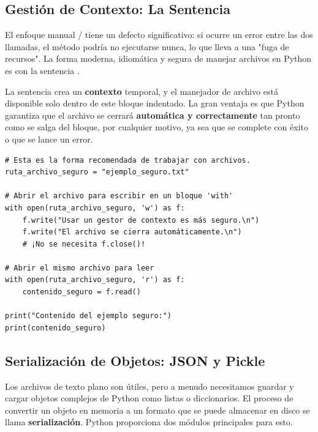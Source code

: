 \subsection{Gestión de Contexto: La Sentencia }
\label{subsec:with_open}
El enfoque manual / tiene un defecto significativo: si ocurre un error entre las dos llamadas, el método  podría no ejecutarse nunca, lo que lleva a una "fuga de recursos". La forma moderna, idiomática y segura de manejar archivos en Python es con la sentencia .

La sentencia  crea un \textbf{contexto} temporal, y el manejador de archivo está disponible solo dentro de este bloque indentado. La gran ventaja es que Python garantiza que el archivo se cerrará \textbf{automática y correctamente} tan pronto como se salga del bloque, por cualquier motivo, ya sea que se complete con éxito o que se lance un error.

\begin{example}
\text{ }\begin{verbatim}
# Esta es la forma recomendada de trabajar con archivos.
ruta_archivo_seguro = "ejemplo_seguro.txt"

# Abrir el archivo para escribir en un bloque 'with'
with open(ruta_archivo_seguro, 'w') as f:
    f.write("Usar un gestor de contexto es más seguro.\n")
    f.write("El archivo se cierra automáticamente.\n")
    # ¡No se necesita f.close()!

# Abrir el mismo archivo para leer
with open(ruta_archivo_seguro, 'r') as f:
    contenido_seguro = f.read()

print("Contenido del ejemplo seguro:")
print(contenido_seguro)
\end{verbatim}
\end{example}

\subsection{Serialización de Objetos: JSON y Pickle}
\label{subsec:serialization}
Los archivos de texto plano son útiles, pero a menudo necesitamos guardar y cargar objetos complejos de Python como listas o diccionarios. El proceso de convertir un objeto en memoria a un formato que se puede almacenar en disco se llama \textbf{serialización}. Python proporciona dos módulos principales para esto.

